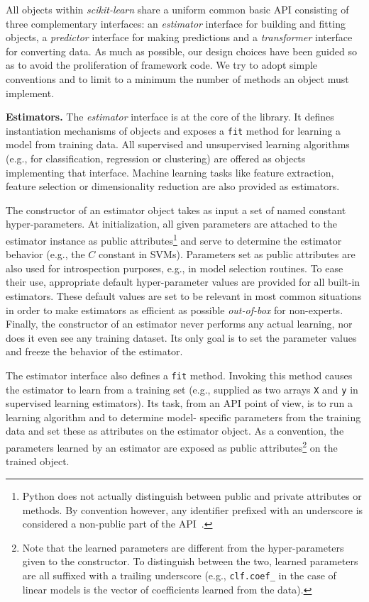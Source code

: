 \documentclass{llncs}
\begin{document}
All objects within \textit{scikit-learn} share a uniform common basic API
consisting of three complementary interfaces: an \textit{estimator} interface
for building and fitting objects, a \textit{predictor} interface for making
predictions and a \textit{transformer} interface for converting data.
As much as possible, our design choices have been guided so as to avoid
the proliferation of framework code. We try to adopt simple conventions and
to limit to a minimum the number of methods an object must implement.

\textbf{Estimators.} The \textit{estimator} interface is at the core of the
library. It defines instantiation mechanisms of objects and exposes a
\texttt{fit} method for learning a model from training data.  All supervised and
unsupervised learning algorithms (e.g., for classification, regression or
clustering) are offered as objects implementing that interface. Machine
learning tasks like feature extraction, feature selection or dimensionality
reduction are also provided as estimators.

The constructor of an estimator object takes as input a set of named constant
hyper-parameters. At initialization, all given parameters are attached to the
estimator instance as public attributes\footnote{Python does not actually
distinguish between public and private  attributes or methods. By convention
however, any identifier prefixed with an underscore is considered a non-public
part of the API~\citep{pythontut}.} and serve to determine the estimator
behavior (e.g., the $C$ constant in SVMs). Parameters set as public attributes
are also used for introspection purposes, e.g., in model selection routines. To
ease their use, appropriate default hyper-parameter values are provided for all
built-in estimators. These default values are set to be relevant in most common
situations in order to make estimators as efficient as possible \textit{out-of-box}
for non-experts. Finally, the constructor of an estimator never performs
any actual learning, nor does it even see any training dataset. Its only goal is
to set the parameter values and freeze the behavior of the estimator.

The estimator interface also defines a \texttt{fit} method. Invoking this method
causes the estimator to learn from a training set (e.g., supplied as two arrays
\texttt{X} and \texttt{y} in supervised learning estimators). Its task, from an
API point of view, is to run a learning algorithm and to determine model-
specific  parameters from the training data and set these as attributes on the
estimator object. As a convention, the parameters learned by an estimator are
exposed as public attributes\footnote{Note that the learned parameters are
different from the hyper-parameters given to the constructor. To distinguish
between the two, learned parameters are all suffixed with a trailing underscore
(e.g., \texttt{clf.coef\_} in the case of linear models is the vector of
coefficients learned from the data).} on the trained object.
\end{document}
